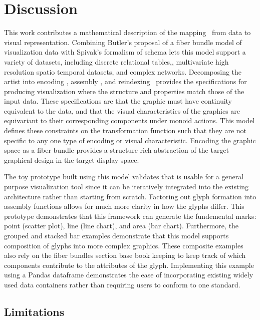 \documentclass[../main.tex]{subfiles}
\begin{document}
\section{Discussion}

This work contributes a mathematical description of the mapping \vartist\ from data to visual representation. Combining Butler's proposal of a fiber bundle model of visualization data with Spivak's formalism of schema lets this model support a variety of datasets, including  discrete relational tables,, multivariate high resolution spatio temporal datasets, and complex networks. Decomposing the artist into encoding \vchannel, assembly \vmark, and reindexing \vindex\ provides the specifications for producing visualization where the structure and properties match those of the input data. These specifications are that the graphic must have continuity equivalent to the data, and that the visual characteristics of the graphics are equivariant to their corresponding components under monoid actions. This model defines these constraints on the transformation function such that they are not specific to any one type of encoding or visual characteristic. Encoding the graphic space as a fiber bundle provides a structure rich abstraction of the target graphical design in the target display space. 


The toy prototype built using this model validates that is usable for a general purpose visualization tool since it can be iteratively integrated into the existing architecture rather than starting from scratch. Factoring out glyph formation into assembly functions allows for much more clarity in how the glyphs differ. This prototype demonstrates that this framework can generate the fundemental marks: point (scatter plot), line (line chart), and area (bar chart). Furthermore, the grouped and stacked bar examples demonstrate that this model supports composition of glyphs into more complex graphics. These composite examples also rely on the fiber bundles section base book keeping to keep track of which components contribute to the attributes of the glyph. Implementing this example using a Pandas dataframe demonstrates the ease of incorporating existing widely used data containers rather than requiring users to conform to one standard. 

\subsection{Limitations}
\end{document}
